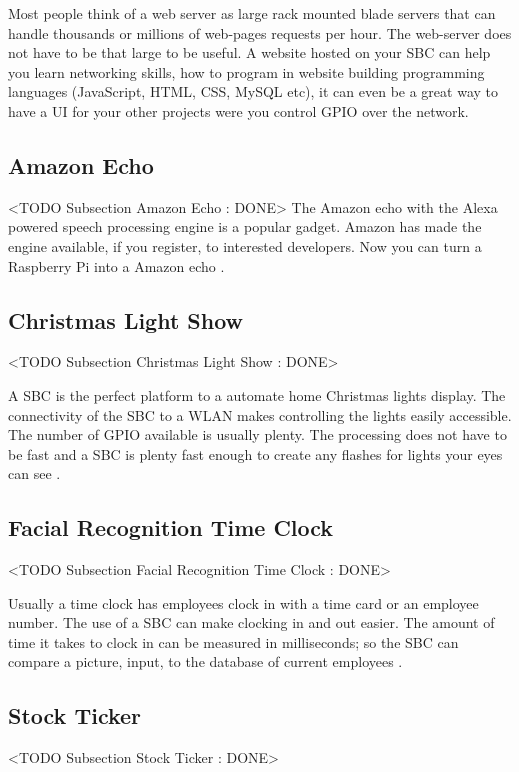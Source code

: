 Most people think of a web server as large rack mounted blade servers that can handle thousands or millions of web-pages requests per hour. The web-server does not have to be that large to be useful. A website hosted on your \ac{SBC} can help you learn networking skills, how to program in website building programming languages (JavaScript, \ac{HTML}, \ac{CSS}, MySQL etc), it can even be a great way to have a \ac{UI} for your other projects were you control \ac{GPIO} over the network.

\subsection{Amazon Echo}
	<TODO Subsection Amazon Echo : DONE>
The Amazon echo with the Alexa powered speech processing engine is a popular gadget. Amazon has made the engine available, if you register, to interested developers. Now you can turn a Raspberry Pi into a Amazon echo \cite{amzecho}. 
	
	
\subsection{Christmas Light Show}
	<TODO Subsection Christmas Light Show : DONE>

A \ac{SBC} is the perfect platform to a automate home Christmas lights display. The connectivity of the \ac{SBC} to a \ac{WLAN} makes controlling the lights easily accessible. The number of \ac{GPIO} available is usually plenty. The processing does not have to be fast and a \ac{SBC} is plenty fast enough to create any flashes for lights your eyes can see \cite{cliteshow}. 
	
	
\subsection{Facial Recognition Time Clock}
	<TODO Subsection Facial Recognition Time Clock : DONE>

Usually a time clock has employees clock in with a time card or an employee number. The use of a \ac{SBC} can make clocking in and out easier. The amount of time it takes to clock in can be measured in milliseconds; so the \ac{SBC} can compare a picture, input, to the database of current employees \cite{facepunch}. 
	
\subsection{Stock Ticker}
	<TODO Subsection Stock Ticker : DONE>


